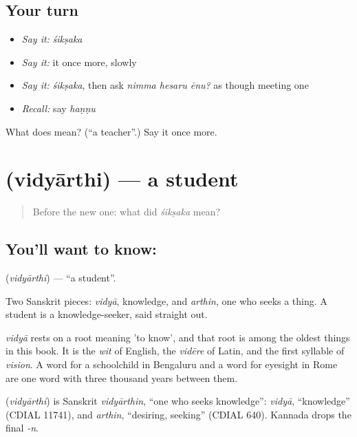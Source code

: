 \subsection*{Your turn}
\begin{itemize}
\raggedright
  \item \emph{Say it:} \emph{śikṣaka}
  \item \emph{Say it:} it once more, slowly
  \item \emph{Say it:} \emph{śikṣaka}, then ask \emph{nimma hesaru ēnu?} as though meeting one
  \item \emph{Recall:} say \emph{haṇṇu}
\end{itemize}

\begin{tcolorbox}[breakable,colback=teal!4,colframe=teal!35!black,title={Before you move on}]
What does  mean? (\textquotedblleft{}a teacher\textquotedblright{}.) Say it once more.
\end{tcolorbox}
\section[\texorpdfstring{\kn{ವಿದ್ಯಾರ್ಥಿ} (vidyārthi)}{ವಿದ್ಯಾರ್ಥಿ (vidyārthi)}]{ (vidyārthi) — a student}

\label{lesson:KA-C48-student}



\begin{quote}
Before the new one: what did \emph{śikṣaka} mean?
\end{quote}

\subsection*{You'll want to know: }
\textbf{} (\emph{vidyārthi}) — \textquotedblleft{}a student\textquotedblright{}.

Two Sanskrit pieces: \emph{vidyā}, knowledge, and \emph{arthin}, one who seeks a thing. A student is a knowledge-seeker, said straight out.

\emph{vidyā} rests on a root meaning 'to know', and that root is among the oldest things in this book. It is the \emph{wit} of English, the \emph{vidēre} of Latin, and the first syllable of \emph{vision}. A word for a schoolchild in Bengaluru and a word for eyesight in Rome are one word with three thousand years between them.

\begin{cousinweb}
\textbf{} (\emph{vidyārthi}) is Sanskrit \emph{vidyārthin}, \textquotedblleft{}one who seeks knowledge\textquotedblright{}: \emph{vidyā}, \textquotedblleft{}knowledge\textquotedblright{} (CDIAL 11741), and \emph{arthin}, \textquotedblleft{}desiring, seeking\textquotedblright{} (CDIAL 640). Kannada drops the final \emph{-n}.
\end{cousinweb}


